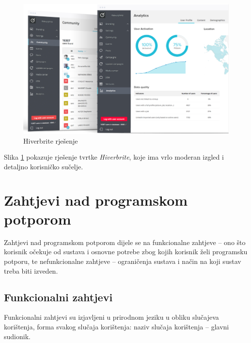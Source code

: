 \documentclass[zavrsni, numeric]{fer}
\begin{document}
\begin{figure}[H]
	\centering
	\includegraphics[width=13cm]{slike/hiverbrite-upravljanje.png}
	\caption{Hiverbrite rješenje}
	\label{fig:hiverbrite-menagements}
\end{figure}

Slika \ref{fig:hiverbrite-menagements} pokazuje rješenje tvrtke \textit{Hiverbrite}, koje ima vrlo moderan izgled i detaljno korisničko sučelje.

\chapter{Zahtjevi nad programskom potporom}
Zahtjevi nad programskom potporom dijele se na funkcionalne zahtjeve – ono što korisnik očekuje od sustava i osnovne potrebe zbog kojih korisnik želi programsku potporu, te nefunkcionalne zahtjeve – ograničenja sustava i način na koji sustav treba biti izveden.

\section{Funkcionalni zahtjevi}
Funkcionalni zahtjevi su izjavljeni u prirodnom jeziku u obliku slučajeva korištenja, forma svakog slučaja korištenja: naziv slučaja korištenja – glavni sudionik.
\end{document}
